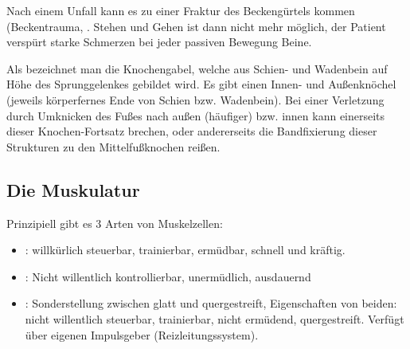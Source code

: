 
\noindent Nach einem Unfall kann es zu einer Fraktur des Beckengürtels kommen
(Beckentrauma, . Stehen und Gehen ist dann nicht
mehr möglich, der Patient verspürt starke Schmerzen bei jeder passiven
Bewegung  Beine. 


Als  bezeichnet man die Knochengabel, welche aus Schien- und
Wadenbein auf Höhe des Sprunggelenkes gebildet wird. Es gibt einen Innen- und
Außenknöchel (jeweils körperfernes Ende von Schien bzw. Wadenbein). Bei einer
Verletzung durch Umknicken des Fußes nach außen (häufiger) bzw. innen kann
einerseits dieser Knochen-Fortsatz brechen, oder andererseits die Bandfixierung
dieser Strukturen zu den Mittelfußknochen reißen.


 

\subsection{Die Muskulatur}

Prinzipiell gibt es 3  Arten von Muskelzellen:

\begin{itemize}
    \item {}:
    willkürlich steuerbar, trainierbar, er\-müd\-bar,  schnell und
    kräftig.     
    \item {}: Nicht willentlich
    kontrollierbar, unermüdlich, ausdauernd
    \item {}: Sonderstellung zwischen glatt und
    quergestreift, Eigenschaften von beiden: nicht willentlich
    steuerbar, trainierbar, nicht ermüdend, quergestreift.
    Verfügt über eigenen Impulsgeber (Reizleitungssystem).
\end{itemize}

